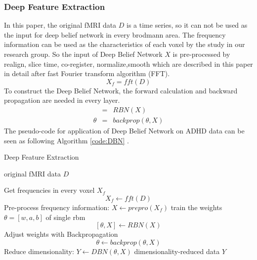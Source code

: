 \documentclass{article}
\begin{document}
\subsubsection{Deep Feature Extraction}
In this paper, the original fMRI data $D$ is a time series, so it can not be used as the input for deep belief network in every brodmann area. The frequency information can be used as the characteristics of each voxel by the study in our research group. So the input of Deep Belief Network $X$ is pre-processed by realign, slice time, co-register, normalize,smooth which are described in this paper\cite{18} in detail after fast Fourier transform algorithm (FFT). 
\begin{equation}
X_f = fft(D) 
\end{equation}
To construct the Deep Belief Network, the forward calculation and backward propagation are needed in every layer.
\begin{eqnarray}
[\theta,X] &=& RBN(X)   \\
\theta  &=& backprop(\theta,X)
\end{eqnarray}
The pseudo-code for application of Deep Belief Network on ADHD data can be seen as following Algorithm \ref{code:DBN} .
\begin{algorithm}[h]
\caption{Deep Feature Extraction}
\label{code:DBN}
\begin{algorithmic}[1]
\Require
original fMRI data $D$

\State Get frequencies in every voxel $X_f$
\[ X_f \gets fft(D)\]
\State Pre-process frequency information: $X \gets prepro(X_f)$ 
\State train the weights $\theta=[w,a,b]$ of single rbm
\[
[\theta,X]\gets RBN(X)
\]
\EndFor
\State Adjust weights with Backpropagation
\[
\theta \gets backprop(\theta,X)
\]
\State Reduce dimensionality:  $Y \gets DBN(\theta,X)$ 
\Ensure
dimensionality-reduced data $Y$
\end{algorithmic}
\end{algorithm}
\end{document}
